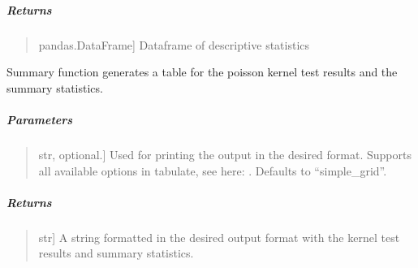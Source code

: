 \documentclass[letterpaper,10pt,english,openany,oneside]{sphinxmanual}
\begin{document}
{{{{\begin{fulllineitems}
\subparagraph{Returns}
\label{\detokenize{api_reference/generated/QuadratiK.poisson_kernel_test.PoissonKernelTest:returns}}\begin{quote}
\begin{description}
\sphinxlineitem{summary\_stats\_df}{[}pandas.DataFrame{]}
\sphinxAtStartPar
Dataframe of descriptive statistics

\end{description}
\end{quote}

\end{fulllineitems}


\begin{fulllineitems}
\label{\detokenize{api_reference/generated/QuadratiK.poisson_kernel_test.PoissonKernelTest:QuadratiK.poisson_kernel_test.PoissonKernelTest.summary}}
\pysigstartsignatures
{}
\pysigstopsignatures
\sphinxAtStartPar
Summary function generates a table for
the poisson kernel test results and the summary statistics.


\subparagraph{Parameters}
\label{\detokenize{api_reference/generated/QuadratiK.poisson_kernel_test.PoissonKernelTest:id1}}\begin{quote}
\begin{description}
\sphinxlineitem{print\_fmt}{[}str, optional.{]}
\sphinxAtStartPar
Used for printing the output in the desired format.
Supports all available options in tabulate,
see here: .
Defaults to “simple\_grid”.

\end{description}
\end{quote}


\subparagraph{Returns}
\label{\detokenize{api_reference/generated/QuadratiK.poisson_kernel_test.PoissonKernelTest:id2}}\begin{quote}
\begin{description}
\sphinxlineitem{summary}{[}str{]}
\sphinxAtStartPar
A string formatted in the desired output
format with the kernel test results and summary statistics.


\end{description}
\end{quote}
\end{fulllineitems}}}}}
\end{document}

